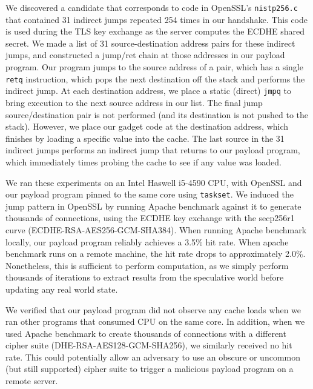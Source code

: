 We discovered a candidate that corresponds to code in OpenSSL's
\texttt{nistp256.c} that contained 31 indirect jumps repeated 254 times in our
handshake. This code is used during the TLS key exchange as the server computes
the ECDHE shared secret. We made a list of 31 source-destination address pairs
for these indirect jumps, and constructed a jump/ret chain at those addresses in
our payload program. Our program jumps to the source address of a pair,
which has a single \texttt{retq} instruction, which pops the next
destination off the stack and performs the indirect jump. At each destination
address, we place a static (direct) \texttt{jmpq} to bring execution to the
next source address in our list. The final jump source/destination pair is not
performed (and its destination is not pushed to the stack). However, we place
our gadget code at the destination address, which finishes by loading a specific value
into the cache.
The last source in the 31 indirect jumps performs an indirect jump that returns to our
payload program, which immediately times probing the cache to see if any value was
loaded.

We ran these experiments on an Intel Haswell
i5-4590 CPU, with OpenSSL and our payload program pinned to the same core using
\texttt{taskset}.
We induced the jump pattern in OpenSSL by running Apache benchmark against it to
generate thousands of connections, using the ECDHE key exchange with the
secp256r1 curve (ECDHE-RSA-AES256-GCM-SHA384). When running Apache benchmark locally, our payload program
reliably achieves a 3.5\% hit rate. When apache benchmark runs on a remote
machine, the hit rate drops to approximately 2.0\%. Nonetheless, this is
sufficient to perform computation, as we simply perform thousands of iterations
to extract results from the speculative world before updating any real world state.

We verified that our payload program did not observe any cache loads when we ran
other programs that consumed CPU on the same core. In addition, when we used
Apache benchmark to create thousands of connections with a different cipher
suite (DHE-RSA-AES128-GCM-SHA256), we similarly received no hit rate. This
could potentially allow an adversary to use an obscure or uncommon (but still
supported) cipher suite to trigger a malicious payload program on a remote server.

